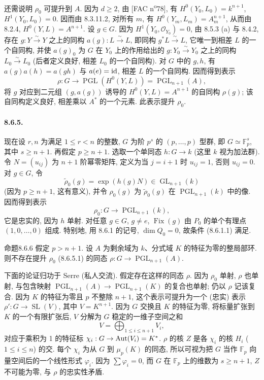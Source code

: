 还需说明 $\rho_0$ 可提升到 $A$. 因为 $d\geq2$, 由 [FAC n\textsuperscript{o}78], 有 $H^0(Y_0,L_0)=k^{n+1}$, $H^1(Y_0,L_0)=0$. 因而由 8.3.11.2, 对所有 $m$, 有 $H^0(Y_m,L_m)=A_m^{n+1}$, 从而由 8.2.4, $H^0(Y,L)=A^{n+1}$. 设 $g\in G$. 因为 $H^1(Y_0,\mathcal O_{Y_0})=0$, 由 8.5.3 (a) 与 8.4.2, 存在 $g:Y\xrightarrow\sim Y$ 之上的同构 $a(g):L\xrightarrow\sim L$, 即同构 $g^*L\xrightarrow\sim L$, 它唯一到相差 $L$ 的一个自同构, 并使 $a(g)_0$ 为 $G$ 在 $Y_0$ 上的作用给出的 $g:Y_0\xrightarrow\sim Y_0$ 之上的同构 $L_0\xrightarrow\sim L_0$ (后者定义良好, 相差 $L_0$ 的一个自同构). 对 $G$ 中的 $g,h$, 有 $a(g)a(h)=a(gh)$ 与 $a(e)=\mathrm{id}$, 相差 $L$ 的一个自同构. 因而得到表示
\[\rho:G\longrightarrow\operatorname{PGL}(H^0(Y,L))=\operatorname{PGL}_{n+1}(A),\]
将 $g$ 对应到二元组 $(g,a(g))$ 诱导的 $H^0(Y,L)=A^{n+1}$ 的自同构 $\rho(g)$; 该自同构定义良好, 相差乘以 $A^*$ 的一个元素. 此表示提升 $\rho_0$.

\paragraph{8.6.5.}
现在设 $r,n$ 为满足 $1\leq r<n$ 的整数, $G$ 为阶 $p^s$ 的 $(p,\ldots,p)$ 型群, 即 $G\simeq\mathbb F_p^s$, 其中 $s\geq n+1$. 再假定 $p\geq n+1$. 选取一个单同态 $h:G\to k$ (这里 $k$ 视为加法群). 令 $N=(u_{ij})$ 为 $n+1$ 阶幂零矩阵, 定义为当 $j=i+1$ 时 $u_{ij}=1$, 否则 $u_{ij}=0$. 对 $g\in G$, 令
\[\widetilde\rho_0(g)=\exp(h(g)N)\in\operatorname{GL}_{n+1}(k)\]
(因为 $p\geq n+1$, 这有意义), 并令 $\rho_0(g)$ 为 $\widetilde\rho_0(g)$ 在 $\operatorname{PGL}_{n+1}(k)$ 中的像. 因而得到表示
\begin{equation}\rho_0:G\longrightarrow\operatorname{PGL}_{n+1}(k),\tag{8.6.5.1}\label{ch08:eq8651}\end{equation}
它是忠实的, 因为 $h$ 单射. 对任意 $g\in G$, $g\ne e$, $\operatorname{Fix}(g)$ 由 $P_0$ 的单个有理点 $(1,0,\ldots,0)$ 组成. 特别地, 用 8.6.1 的记号, $\dim Q_0=0$, 故条件 (8.6.1.1) 满足.

\begin{origstatement}{命题}{8.6.6}\label{ch08:prop866}
假定 $p>n+1$. 设 $A$ 为剩余域为 $k$、分式域 $K$ 的特征为零的整局部环. 则不存在提升 $\rho_0$ (8.6.5.1) 的同态 $\rho:G\to\operatorname{PGL}_{n+1}(A)$.
\end{origstatement}
下面的论证归功于 Serre (私人交流). 假定存在这样的同态 $\rho$. 因为 $\rho_0$ 单射, $\rho$ 也单射, 与包含映射 $\operatorname{PGL}_{n+1}(A)\to\operatorname{PGL}_{n+1}(K)$ 的复合也单射; 仍以 $\rho$ 记该复合. 因为 $K$ 的特征为零且 $p$ 不整除 $n+1$, 这个表示可提升为一个 (忠实) 表示 $\rho':G\to\operatorname{SL}(V)$, 其中 $V=K^{n+1}$. 因为 $G$ 交换且 $K$ 的特征为零, 将标量扩张到 $K$ 的一个有限扩张后, $V$ 分解为 $G$ 稳定的一维子空间之和
\[V=\bigoplus_{1\leq i\leq n+1}V_i,\]
对应于乘积为 1 的特征标 $\chi_i:G\to\operatorname{Aut}(V_i)=K^*$. $\rho$ 的核 $Z$ 是各 $\chi_i$ 的核 $H_i$ ($1\leq i\leq n$) 的交. 每个 $\chi_i$ 为从 $G$ 到 $\mu_p(K)$ 的同态, 所以可视为把 $G$ 当作 $\mathbb F_p$ 向量空间后的一个线性形式 $\varphi_i$. 因为 $\sum\varphi_i=0$, 而 $G$ 在 $\mathbb F_p$ 上的维数为 $s\geq n+1$, $Z$ 不可能为零, 与 $\rho$ 的忠实性矛盾.

